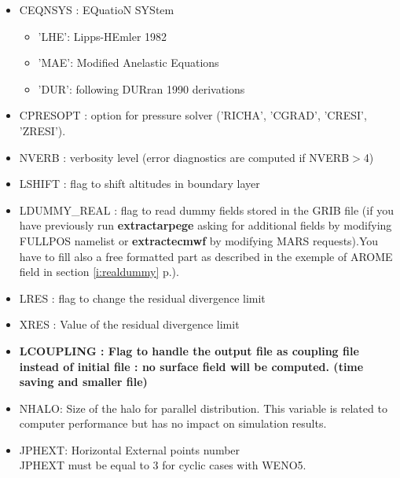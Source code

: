 \begin{itemize}
\item CEQNSYS : EQuatioN SYStem
\begin{itemize}
\item 'LHE': Lipps-HEmler 1982
\item 'MAE': Modified Anelastic Equations
\item 'DUR': following DURran 1990 derivations
\end{itemize}

\item CPRESOPT : option for pressure solver 
('RICHA', 'CGRAD', 'CRESI', 'ZRESI').

\item NVERB : verbosity level (error diagnostics are computed if
NVERB$>$4)

\item LSHIFT : flag to shift altitudes in boundary layer

\item LDUMMY\_REAL : flag to read dummy fields stored in the GRIB file (if you have previously run {\bf extractarpege}
asking for additional fields by modifying FULLPOS namelist or {\bf extractecmwf} by modifying MARS requests).You have to fill also a free formatted part as described in the exemple of AROME field in section \ref{i:realdummy} p.\pageref{i:realdummy}).

\item LRES : flag to change the residual divergence limit

\item XRES : Value of the residual divergence limit

\item \textbf{LCOUPLING : Flag to handle the output file as coupling file instead of initial file : no surface field will be computed. (time saving and smaller file) }

\item
NHALO: Size of the halo for parallel distribution.
This variable is related to computer performance but has no
impact on simulation results.\\

\item
JPHEXT:  Horizontal External points number\\
JPHEXT must be equal to 3 for cyclic cases with WENO5.

\end{itemize}


